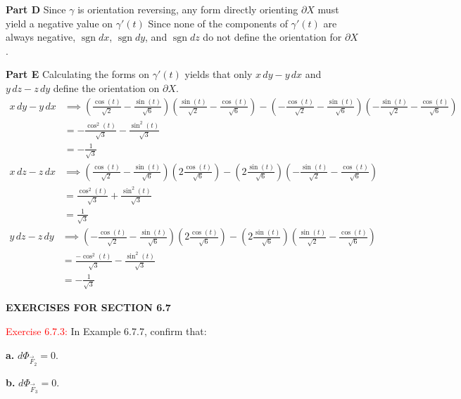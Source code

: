 \documentclass[12pt]{article}
\begin{document}
\textbf{Part D}
Since $\gamma$ is orientation reversing,
any form directly orienting $\partial X$ must yield a negative yalue on $\gamma'(t)$
Since none of the components of $\gamma'(t)$ are always negative,
$\operatorname{sgn} dx$,
$\operatorname{sgn} dy$, and
$\operatorname{sgn} dz$ do not define the orientation for $\partial X$.

\textbf{Part E}
Calculating the forms on $\gamma'(t)$ yields that only $x\,dy - y\,dx$ and $y\,dz - z\,dy$ 
define the orientation on $\partial X$.
\begin{align*}
    x\,dy - y\,dx
    &\implies \left(\frac{\cos(t)}{\sqrt{2}} - \frac{\sin(t)}{\sqrt{6}}\right)\left(\frac{\sin(t)}{\sqrt{2}} - \frac{\cos(t)}{\sqrt{6}}\right)
        - \left(-\frac{\cos(t)}{\sqrt{2}} - \frac{\sin(t)}{\sqrt{6}}\right)\left(-\frac{\sin(t)}{\sqrt{2}} - \frac{\cos(t)}{\sqrt{6}}\right) \\
    &= -\frac{\cos^2(t)}{\sqrt{3}} - \frac{\sin^2(t)}{\sqrt{3}} \\
    &= -\frac{1}{\sqrt{3}}
\end{align*}
\begin{align*}
    x\,dz - z\,dx
    &\implies \left(\frac{\cos(t)}{\sqrt{2}} - \frac{\sin(t)}{\sqrt{6}}\right)\left(2\frac{\cos(t)}{\sqrt{6}}\right)
        - \left(2\frac{\sin(t)}{\sqrt{6}}\right)\left(-\frac{\sin(t)}{\sqrt{2}} - \frac{\cos(t)}{\sqrt{6}}\right) \\
    &= \frac{\cos^2(t)}{\sqrt{3}} + \frac{\sin^2(t)}{\sqrt{3}} \\
    &= \frac{1}{\sqrt{3}}
\end{align*}
\begin{align*}
    y\,dz - z\,dy
    &\implies \left(-\frac{\cos(t)}{\sqrt{2}} - \frac{\sin(t)}{\sqrt{6}}\right)\left(2\frac{\cos(t)}{\sqrt{6}}\right)
        - \left(2\frac{\sin(t)}{\sqrt{6}}\right)\left(\frac{\sin(t)}{\sqrt{2}} - \frac{\cos(t)}{\sqrt{6}}\right) \\
    &= \frac{-\cos^2(t)}{\sqrt{3}} - \frac{\sin^2(t)}{\sqrt{3}} \\
    &= -\frac{1}{\sqrt{3}}
\end{align*}
\newpage
\begin{center}
   \textbf{EXERCISES FOR SECTION 6.7}
\end{center}


\textcolor{red}{Exercise 6.7.3:}
In Example 6.7.7, confirm that:

\textbf{a.} $d\Phi_{\vec F_2 }= 0$.

\textbf{b.} $d\Phi_{\vec F_3} = 0$.
\smallskip
\end{document}
